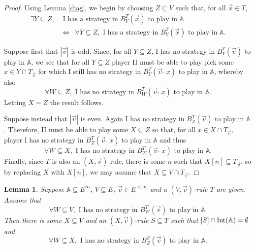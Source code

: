 \documentclass[10pt]{amsart}
\newcommand {\A}{\mathbb A}
\newcommand{\con}{\;\hat{}\;}
\newcommand{\tom} {\emptyset}
\newcommand{\equi}{\Longleftrightarrow}
\newcommand {\e} {\exists}
\renewcommand {\a} {\forall}
\newtheorem{lemme}[thm]{Lemma}
\theoremstyle{definition}
\begin{document}
\begin{proof}
Using Lemma \ref{diag}, we begin by choosing $Z\subseteq V$ such that,  for all $\vec x\in T$,
\[\begin{split}
\e Y\subseteq Z, &\text{ I has a strategy in $B^T_Y(\vec x)$ to play in $\A$ }\\
&
\equi\;\;
\a Y\subseteq Z, \text{ I has a strategy in $B^T_Y(\vec x)$ to play in $\A$}.
\end{split}\]


Suppose first that $|\vec v|$ is odd. Since, for all $Y\subseteq Z$,  I has no strategy in $B^{T}_{Y}(\vec v)$ to play in $\A$, we see that for all $Y\subseteq Z$ player II must be able to play pick some $x\in  Y\cap T_{\vec v}$ for which  I still has no strategy in $B^{T}_{Y}(\vec v\con x)$ to play in $\A$, whereby also
$$
\a W\subseteq Z, \text{ I has no strategy in $B^{T}_{W}(\vec v\con x)$ to play in $\A$}.
$$
Letting $X=Z$ the result follows.


Suppose instead that $|\vec v|$ is even. Again I has no strategy in $B^{T}_{Z}(\vec v)$ to play in $\A$. Therefore, II must be able to play some $X\subseteq Z$ so that, for all $x\in X\cap T_{\vec v}$, player I has no strategy in $B^{T}_{Z}(\vec v\con x)$ to play in $\A$ and thus
$$
\a W\subseteq X, \text{ I has no strategy in $B^{T}_{W}(\vec v\con x)$ to play in $\A$}.
$$
Finally, since $T$ is also an $(X,\vec v)$-rule, there is some $n$ such that $X[n]\subseteq T_{\vec v}$, so by replacing $X$ with $X[n]$, we may assume that $X\subseteq V\cap T_{\vec v}$.
\end{proof}





\begin{lemme}\label{davis1}
Suppose $\A\subseteq E^\infty$, $V\subseteq E$, $\vec v\in E^{<\infty}$ and a $(V,\vec v)$-rule $T$ are given. Assume that 
$$
\a W\subseteq V, \text{    I has no strategy in $B^T_W(\vec v)$ to play in $\A$.}
$$
Then there is some $X\subseteq V$ and an $(X,\vec v)$-rule $S\subseteq T$ such that $[S]\cap {\rm Int}(\A)=\tom$ and
$$
\a W\subseteq X, \text{ I has no strategy in $B_Z^S(\vec v)$ to play in $\A$.}
$$
\end{lemme}
\end{document}
